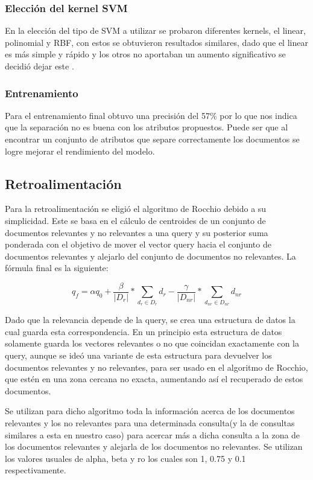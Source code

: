 \documentclass[runningheads]{llncs}
\begin{document}
\subsubsection{Elección del kernel SVM}

En la elección del tipo de SVM a utilizar se probaron diferentes kernels, el linear, polinomial y RBF, con estos
se obtuvieron resultados similares, dado que el linear es más simple y rápido y los otros no aportaban un aumento
significativo se decidió dejar este \cite{svmSklearn}.

\subsubsection{Entrenamiento}

Para el entrenamiento final obtuvo una precisión del 57\% por lo que nos indica que la separación no es buena con
los atributos propuestos. Puede ser que al encontrar un conjunto de atributos que separe correctamente los documentos
se logre mejorar el rendimiento del modelo.

\subsection{Retroalimentación}

Para la retroalimentación se eligió el algoritmo de Rocchio debido a su simplicidad. Este se basa 
en el cálculo de centroides de un conjunto de documentos relevantes y no relevantes a una query
y su posterior suma ponderada con el objetivo de mover el vector query hacia el conjunto de 
documentos relevantes y alejarlo del conjunto de documentos no relevantes. La fórmula final es la siguiente:

\begin{equation}
    q_f = \alpha q_0 + \frac{\beta}{|D_r|}*\sum_{d_r \in D_r} d_r -  \frac{\gamma}{|D_{nr}|}*\sum_{d_{nr} \in D_{nr}} d_{nr} 
\end{equation}

Dado que la relevancia depende de la query, se crea una estructura de datos la cual guarda esta correspondencia. 
En un principio esta estructura de datos solamente guarda los vectores relevantes o no que coincidan exactamente
con la query, aunque se ideó una variante de esta estructura para devuelver los documentos relevantes y no
relevantes, para ser usado en el algoritmo de Rocchio, que estén en una zona cercana no exacta, aumentando así el recuperado de estos documentos.

Se utilizan para dicho algoritmo toda la información acerca de los documentos relevantes y los no 
relevantes para una determinada consulta(y la de consultas similares a esta en nuestro caso) para 
acercar más a dicha consulta a la zona de los documentos relevantes y alejarla de los documentos no 
relevantes. Se utilizan los valores usuales de alpha,
beta y ro los cuales son 1, 0.75 y 0.1 respectivamente. 
\end{document}
